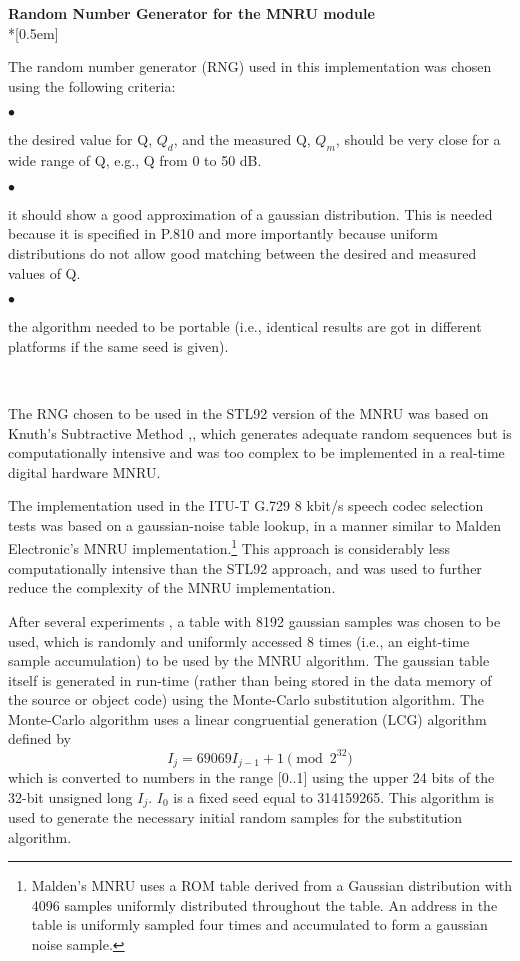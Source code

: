 {\Large\bf Random Number Generator for the MNRU module  }\\*[0.5em]

The random number generator (RNG) used in this implementation was
chosen using the following criteria:

\begin{minipage}{130mm}
 $\bullet$ \parbox[t]{120mm}{
               the desired value for Q, $Q_d$, and the measured Q,
               $Q_m$, should be very
               close for a wide range of Q, e.g., Q from 0 to 50 dB.
               \bigskip}

 $\bullet$ \parbox[t]{120mm}{
               it should show a good approximation of a gaussian
               distribution. This is needed because it is
               specified in P.810 and more importantly because uniform
               distributions do not allow good matching between the
               desired and measured values of Q. \bigskip}

 $\bullet$ \parbox[t]{120mm}{
               the algorithm needed to be portable (i.e., identical results
               are got in different platforms if the same seed is given).}\\
\end{minipage}

The RNG chosen to be used in the STL92 version of the MNRU was based
on Knuth's Subtractive Method \cite{Recipes},\cite[Parts
3.2--3.3]{Knuth}, which generates adequate random sequences but is
computationally intensive and was too complex to be implemented in a
real-time digital hardware MNRU.

The implementation used in the ITU-T G.729 8
kbit/s speech codec selection tests was based on a gaussian-noise
table lookup, in a manner similar to Malden Electronic's
MNRU implementation.\footnote{\SF Malden's MNRU uses a ROM table
derived from  a Gaussian distribution with 4096 samples uniformly
distributed throughout the table. An address in the table is
uniformly sampled four times and accumulated to form a gaussian noise
sample.} This approach is considerably less computationally intensive
than the STL92 approach, and was used to further reduce the
complexity of the MNRU implementation.

After several experiments \cite{Duo-MNRU}, a table with 8192 gaussian
samples was chosen to be used, which is randomly and uniformly
accessed 8 times (i.e., an eight-time sample accumulation) to be used
by the MNRU algorithm. The gaussian table itself is generated in
run-time (rather than being stored in the data memory of the source
or object code) using the Monte-Carlo substitution algorithm.
The Monte-Carlo algorithm uses a linear congruential generation (LCG)
algorithm defined by
\[
            I_{j} = 69069 I_{j-1} + 1 \pmod{2^{32}}
\]
which is converted to numbers in the range [0..1] using the upper 24
bits of the 32-bit unsigned long $I_j$. $I_0$ is a fixed seed equal to
314159265. This algorithm is used to generate the necessary initial random
samples for the substitution algorithm.

